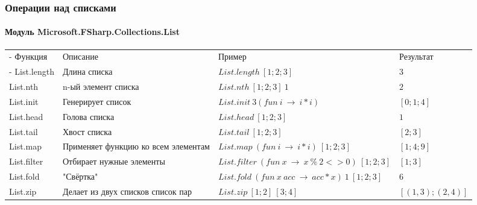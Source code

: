 \documentclass[xetex,mathserif,serif]{beamer}
\begin{document}
	\begin{frame}
		\frametitle{Операции над списками}
		\framesubtitle{Модуль Microsoft.FSharp.Collections.List}
		\begin{small}
			\begin{tabu} {| X[0.5 l p] | X[1 l p] | X[1 l p] | X[0.5 l p] |}
				\tabucline-
				Функция                & Описание                            & Пример                                              & Результат                        \\
				\tabucline-
				\everyrow{\tabucline-}
				List.length            & Длина списка                        & $List.length\ [1;2;3]$                              & $3$          \\
				List.nth               & n-ый элемент списка                 & $List.nth\ [1; 2; 3]\ 1$                            & $2$          \\
				List.init              & Генерирует список                   & $List.init\ 3 (fun\ i\ \rightarrow\ i * i)$         & $[0; 1; 4]$          \\
				List.head              & Голова списка                       & $List.head\ [1; 2; 3]$                              & $1$          \\
				List.tail              & Хвост списка                        & $List.tail\ [1; 2; 3]$                              & $[2; 3]$          \\
				List.map               & Применяет функцию ко всем элементам & $List.map\ (fun\ i\ \rightarrow\ i * i)\ [1; 2; 3]$ & $[1; 4; 9]$          \\
				List.filter            & Отбирает нужные элементы            & $List.filter\ (fun\ x\ \rightarrow\ x\ \%\ 2 <> 0)\ [1; 2; 3]$ & $[1; 3]$          \\
				List.fold              & "Свёртка"  & $List.fold\ (fun\ x\ acc\ \rightarrow\ acc * x)\ 1\ [1; 2; 3]$               & $6$          \\
				List.zip               & Делает из двух списков список пар   & $List.zip\ [1; 2]\ [3; 4]$                          & $[(1, 3); (2, 4)]$          \\
			\end{tabu}
		\end{small}
	\end{frame}
	
\end{document}
